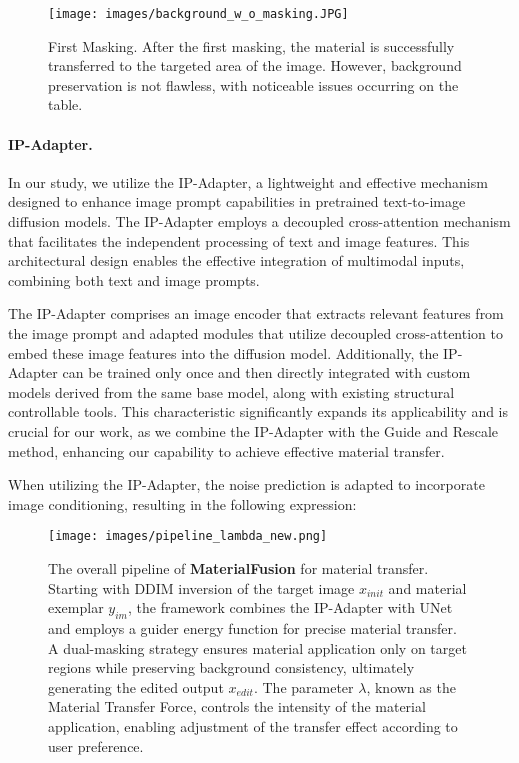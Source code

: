 \begin{figure}[t]
  \centering
   
   \vspace{-15pt}
   \texttt{[image: images/background\_w\_o\_masking.JPG]}

   \caption{First Masking. After the first masking, the material is successfully transferred to the targeted area of the image. However, background preservation is not flawless, with noticeable issues occurring on the table.}
   \label{fig:background}

   \vspace{-5pt}
\end{figure}

\paragraph{IP-Adapter.} In our study, we utilize the IP-Adapter, a lightweight and effective mechanism designed to enhance image prompt capabilities in pretrained text-to-image diffusion models. The IP-Adapter employs a decoupled cross-attention mechanism that facilitates the independent processing of text and image features. This architectural design enables the effective integration of multimodal inputs, combining both text and image prompts. 

The IP-Adapter comprises an image encoder that extracts relevant features from the image prompt and adapted modules that utilize decoupled cross-attention to embed these image features into the diffusion model. Additionally, the IP-Adapter can be trained only once and then directly integrated with custom models derived from the same base model, along with existing structural controllable tools. This characteristic significantly expands its applicability and is crucial for our work, as we combine the IP-Adapter with the Guide and Rescale method, enhancing our capability to achieve effective material transfer.

When utilizing the IP-Adapter, the noise prediction is adapted to incorporate image conditioning, resulting in the following expression:

\begin{figure*}[ht!]
  \centering
   
   \vspace{-15pt}
   \texttt{[image: images/pipeline\_lambda\_new.png]}
   \caption{The overall pipeline of \textbf{MaterialFusion} for material transfer. Starting with DDIM inversion of the target image $x_{init}$ and material exemplar $y_{im}$, the framework combines the IP-Adapter with UNet and employs a guider energy function for precise material transfer. A dual-masking strategy ensures material application only on target regions while preserving background consistency, ultimately generating the edited output $x_{edit}$. The parameter $\lambda$, known as the Material Transfer Force, controls the intensity of the material application, enabling adjustment of the transfer effect according to user preference.}
   \label{fig:pipeline}

   \vspace{-5pt}
\end{figure*}

